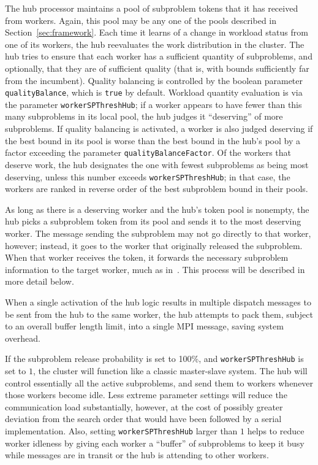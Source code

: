The hub processor maintains a pool of subproblem tokens that it has
received from workers.  Again, this pool may be any one of the pools
described in Section~\ref{sec:framework}.  Each time it learns of a
change in workload status from one of its workers, the hub reevaluates
the work distribution in the cluster.  The hub tries to ensure that
each worker has a sufficient quantity of subproblems, and optionally,
that they are of sufficient quality (that is, with bounds sufficiently
far from the incumbent).  Quality balancing is controlled by the
boolean parameter \texttt{qualityBalance}, which is \texttt{true} by
default.  Workload quantity evaluation is via the parameter
\texttt{workerSPThreshHub}; if a worker appears to have fewer than
this many subproblems in its local pool, the hub judges it
``deserving'' of more subproblems.  If quality balancing is activated,
a worker is also judged deserving if the best bound in its pool is
worse than the best bound in the hub's pool by a factor exceeding the
parameter \texttt{qualityBalanceFactor}.  Of the workers that deserve
work, the hub designates the one with fewest subproblems as being most
deserving, unless this number exceeds \texttt{workerSPThreshHub}; in
that case, the workers are ranked in reverse order of the best
subproblem bound in their pools.

As long as there is a deserving worker and the hub's token pool is
nonempty, the hub picks a subproblem token from its pool and sends it
to the most deserving worker.  The message sending the subproblem may
not go directly to that worker, however; instead, it goes to the
worker that originally released the subproblem.  When that worker
receives the token, it forwards the necessary subproblem information
to the target worker, much as in~\cite{Eck94,Eck97,RRM93}.
This process will be described in more detail below.

When a single activation of the hub logic results in multiple
dispatch messages to be sent from the hub to the same worker, the hub
attempts to pack them, subject to an overall buffer length limit, into
a single MPI message, saving system overhead.

If the subproblem release probability is set to 100\%, and
\texttt{workerSPThreshHub} is set to $1$, the cluster will function
like a classic master-slave system.  The hub will control essentially
all the active subproblems, and send them to workers whenever those
workers become idle.  Less extreme parameter settings will reduce the
communication load substantially, however, at the cost of possibly
greater deviation from the search order that would have been followed
by a serial implementation.  Also, setting \texttt{workerSPThreshHub}
larger than $1$ helps to reduce worker idleness by giving each worker
a ``buffer'' of subproblems to keep it busy while messages are in
transit or the hub is attending to other workers.

